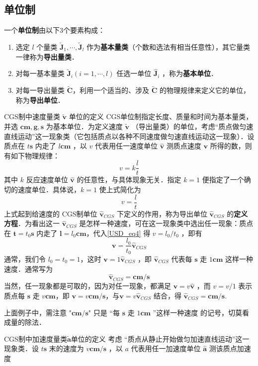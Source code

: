 \subsection{单位制}
一个\textbf{单位制}由以下3个要素构成：
\begin{enumerate}
\item 选定 $l$ 个量类 $\tilde{\boldsymbol{J}}_1,\cdots,\tilde{\boldsymbol{J}}_l$ 作为\textbf{基本量类}（个数和选法有相当任意性），其它量类一律称为\textbf{导出量类}．  
\item 对每一基本量类 $\tilde{\boldsymbol{J}}_i(i=1,\cdots,l)$ 任选一单位 $\hat{\boldsymbol{J}}_i$ ，称为\textbf{基本单位}．
\item 对每一导出量类 $\tilde{\boldsymbol{C}}$，利用一个适当的、涉及 $\tilde{\boldsymbol{C}}$ 的物理规律来定义它的单位，称为\textbf{导出单位}．
\end{enumerate}
\begin{example}{CGS制中速度量类 $\tilde{\boldsymbol{v}
}$ 单位的定义}
CGS单位制指定长度、质量和时间为基本量类，并选 $\boldsymbol{cm},\boldsymbol{g},\boldsymbol{s}$ 为基本单位．为定义速度 $\tilde{\boldsymbol{v}}$ （导出量类）的单位，考虑“质点做匀速直线运动”这一现象类（它包括质点以各种不同速度做匀速直线运动这一现象）．设质点在 $t\boldsymbol{s}$ 内走了 $l\boldsymbol{cm}$ ，以 $v$ 代表用任一速度单位 $\hat{\boldsymbol{v}}$ 测质点速度 $\boldsymbol{v}$ 所得的数，则有如下物理规律：
\begin{equation}
v=k\frac{l}{t}
\end{equation}
其中 $k$ 反应速度单位 $\hat{\boldsymbol{v}}$ 的任意性，与具体现象无关．指定 $k=1$ 便指定了一个确切的速度单位．具体说，$k=1$ 使上式简化为
\begin{equation}\label{USD_eq4}
v=\frac{l}{t}
\end{equation}
上式起到给速度的 CGS制单位 $\hat{\boldsymbol{v}}_{CGS}$ 下定义的作用，称为导出单位 $\hat{\boldsymbol{v}}_{CGS}$ 的\textbf{定义方程}．为看出这一 $\hat{\boldsymbol{v}}_{CGS}$ 是怎样一种速度，可在这一现象类中选出任一现象：质点在 $\boldsymbol{t}=t_0\boldsymbol{s}$ 内走了 $\boldsymbol{l}=l_0\boldsymbol{cm}$，代入\autoref{USD_eq4} 得 $v=l_0/t_0$ ，即有
\begin{equation}
\boldsymbol{v}=\frac{l_0}{t_0}\hat{\boldsymbol{v}}_{CGS}
\end{equation}
通常，我们令 $l_0=t_0=1$，这时 $\boldsymbol{v}=1\hat{\boldsymbol{v}}_{CGS}$ ，即 $\hat{\boldsymbol{v}}_{CGS}$ 代表每 $\boldsymbol{s}$ 走 $1\boldsymbol{cm}$ 这样一种速度．通常写为
\begin{equation}
\hat{\boldsymbol{v}}_{CGS}=\boldsymbol{cm/s}
\end{equation}
当然，任一现象都是可取的，因为对任一现象，都满足 $\boldsymbol{v}=v\hat{\boldsymbol{v}}$ ，而 $v=v/1$ 表示质点每 $\boldsymbol{s}$ 走 $v\boldsymbol{cm}$，即 $\boldsymbol{v}=v\boldsymbol{cm/s}$，与$\boldsymbol{v}=v\hat{\boldsymbol{v}}_{CGS}$ 结合，得 $\hat{\boldsymbol{v}}_{CGS}=\boldsymbol{cm/s}$.

\end{example}
上面例子中，需注意 "$\boldsymbol{cm/s}$" 只是 “每 $\boldsymbol{s}$ 走 $1\boldsymbol{cm}$ ”这样一种速度 的记号，切莫看成量的除法．
\begin{example}{CGS制中加速度量类$\tilde{\boldsymbol{a}}$单位的定义}
考虑 “质点从静止开始做匀加速直线运动”这一现象类．设 $t\boldsymbol{s}$ 末的速度为 $v\boldsymbol{cm/s}$ ，以 $a$ 代表用任一加速度单位 $\hat{\boldsymbol{a}}$ 测该质点加速度
\end{example}